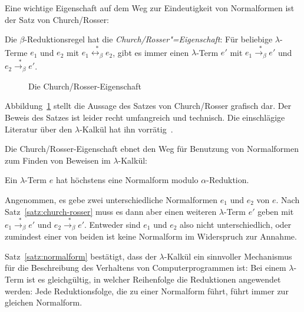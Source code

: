 Eine wichtige Eigenschaft auf dem Weg zur Eindeutigkeit von
Normalformen ist der Satz von Church/Rosser:
%
\begin{satz}
  \label{satz:church-rosser}
  Die $\beta$-Reduktionsregel hat die 
  \textit{Church/Rosser"=Eigenschaft}:  Für
  beliebige $\lambda$-Terme $e_1$ und  $e_2$ mit
  $e_1 \overset{\ast}{\leftrightarrow_\beta} e_2$,
  gibt es immer einen $\lambda$-Term $e'$ mit
  $e_1\overset{\ast}{\rightarrow_\beta} e'$ und
  $e_2\overset{\ast}{\rightarrow_\beta} e'$.
\end{satz}
%
\begin{figure}[htb]
  \begin{center}
    \caption{Die Church/Rosser-Eigenschaft}
    \label{fig:church-rosser}
  \end{center}
\end{figure}
Abbildung~\ref{fig:church-rosser} stellt die Aussage des Satzes von
Church/Rosser grafisch dar.
Der Beweis des Satzes ist leider recht umfangreich und technisch.
Die einschlägige Literatur über den $\lambda$-Kalkül hat ihn
vorrätig~\cite{HindleySeldin1986}.

Die Church/Rosser-Eigenschaft ebnet den Weg für Benutzung von
Normalformen zum Finden von Beweisen im $\lambda$-Kalkül:
%
\begin{satz}
  \label{satz:normalform}
  Ein $\lambda$-Term $e$ hat höchstens eine Normalform modulo
  $\alpha$-Reduktion.
\end{satz}
%
\begin{beweis}
  Angenommen, es gebe zwei unterschiedliche Normalformen $e_1$ und
  $e_2$ von $e$.  Nach Satz~\ref{satz:church-rosser} muss es dann
  aber einen weiteren $\lambda$-Term $e'$ geben mit   $e_1\overset{\ast}{\rightarrow_\beta} e'$ und
  $e_2\overset{\ast}{\rightarrow_\beta} e'$.  Entweder sind $e_1$ und
  $e_2$ also nicht unterschiedlich, oder zumindest einer von
  beiden ist keine Normalform im Widerspruch zur Annahme.
\end{beweis}
Satz~\ref{satz:normalform} bestätigt, dass
der $\lambda$-Kalkül ein sinnvoller Mechanismus für die Beschreibung
des Verhaltens von Computerprogrammen ist: Bei einem $\lambda$-Term
ist es gleichgültig, in welcher Reihenfolge die Reduktionen
angewendet werden: Jede Reduktionsfolge, die zu einer Normalform
führt, führt immer zur gleichen Normalform.

